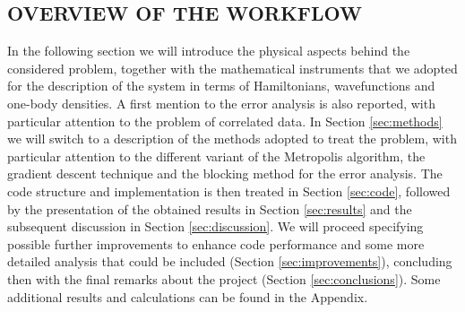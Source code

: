 \subsection{OVERVIEW OF THE WORKFLOW}
In the following section we will introduce the physical aspects behind the considered problem, together with the mathematical instruments that we adopted for the description of the system in terms of Hamiltonians, wavefunctions and one-body densities. A first mention to the error analysis is also reported, with particular attention to the problem of correlated data. In Section \ref{sec:methods} we will switch to a description of the methods adopted to treat the problem, with particular attention to the different variant of the Metropolis algorithm, the gradient descent technique and the blocking method for the error analysis. The code structure and implementation is then treated in Section \ref{sec:code}, followed by the presentation of the obtained results in Section \ref{sec:results} and the subsequent discussion in Section \ref{sec:discussion}. We will proceed specifying possible further improvements to enhance code performance and some more detailed analysis that could be included (Section \ref{sec:improvements}), concluding then with the final remarks about the project (Section \ref{sec:conclusions}). Some additional results and calculations can be found in the Appendix.